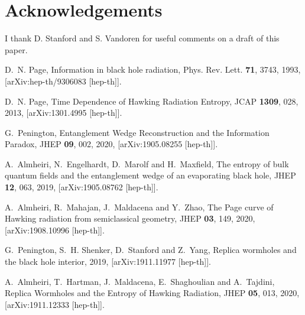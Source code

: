 \documentclass[12pt]{article}
\numberwithin{equation}{section}
\begin{document}
\section*{Acknowledgements}
I thank D. Stanford and S. Vandoren for useful comments on a draft of this paper.

\providecommand{\href}[2]{#2}\begingroup\raggedright\begin{thebibliography}{10}

D.~N. Page, {{Information in black hole radiation}},
  \href{http://dx.doi.org/10.1103/PhysRevLett.71.3743}{Phys. Rev. Lett. {\bf
  71}, 3743, 1993},
  [\href{http://arxiv.org/abs/arXiv:hep-th/9306083}{{arXiv:hep-th/9306083
  [hep-th]}}].

D.~N. Page, {{Time Dependence of Hawking Radiation Entropy}},
  \href{http://dx.doi.org/10.1088/1475-7516/2013/09/028}{JCAP {\bf 1309}, 028,
  2013}, [\href{http://arxiv.org/abs/arXiv:1301.4995}{{arXiv:1301.4995
  [hep-th]}}].

G.~Penington, {{Entanglement Wedge Reconstruction and the Information
  Paradox}}, \href{http://dx.doi.org/10.1007/JHEP09(2020)002}{JHEP {\bf 09},
  002, 2020}, [\href{http://arxiv.org/abs/arXiv:1905.08255}{{arXiv:1905.08255
  [hep-th]}}].

A.~Almheiri, N.~Engelhardt, D.~Marolf and H.~Maxfield, {{The entropy of bulk
  quantum fields and the entanglement wedge of an evaporating black hole}},
  \href{http://dx.doi.org/10.1007/JHEP12(2019)063}{JHEP {\bf 12}, 063, 2019},
  [\href{http://arxiv.org/abs/arXiv:1905.08762}{{arXiv:1905.08762 [hep-th]}}].

A.~Almheiri, R.~Mahajan, J.~Maldacena and Y.~Zhao, {{The Page curve of Hawking
  radiation from semiclassical geometry}},
  \href{http://dx.doi.org/10.1007/JHEP03(2020)149}{JHEP {\bf 03}, 149, 2020},
  [\href{http://arxiv.org/abs/arXiv:1908.10996}{{arXiv:1908.10996 [hep-th]}}].

G.~Penington, S.~H. Shenker, D.~Stanford and Z.~Yang, {{Replica wormholes and
  the black hole interior}},  2019,
  [\href{http://arxiv.org/abs/arXiv:1911.11977}{{arXiv:1911.11977 [hep-th]}}].

A.~Almheiri, T.~Hartman, J.~Maldacena, E.~Shaghoulian and A.~Tajdini, {{Replica
  Wormholes and the Entropy of Hawking Radiation}},
  \href{http://dx.doi.org/10.1007/JHEP05(2020)013}{JHEP {\bf 05}, 013, 2020},
  [\href{http://arxiv.org/abs/arXiv:1911.12333}{{arXiv:1911.12333 [hep-th]}}].


\end{thebibliography}
\end{document}
